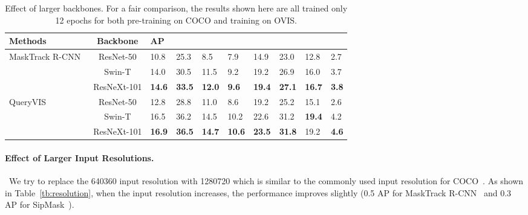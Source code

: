 \documentclass[twocolumn]{svjour3}          \smartqed  \usepackage{graphicx}
\def\myTextColor{\textcolor[rgb]{0, 0, 0}}
\begin{document}
\begin{sloppypar}
\begin{table*}
\centering
\begin{tabular}{|l|c|p{0.48cm}<{\centering}p{0.48cm}<{\centering}p{0.57cm}<{\centering}p{0.48cm}<{\centering}p{0.6cm}<{\centering}|p{0.6cm}<{\centering}p{0.6cm}<{\centering}p{0.6cm}<{\centering}|}
\hline
Methods & Backbone & AP  &   &   &   &  &   &   &  \\
\hline
\hline
\multirow{3}{*}{MaskTrack R-CNN~\cite{youtube_vis}} & ResNet-50 & 10.8 & 25.3 & 8.5 & 7.9 & 14.9 & 23.0 & 12.8 & 2.7 \\
& Swin-T & 14.0 & 30.5 & 11.5 & 9.2 & 19.2 & 26.9 & 16.0 & 3.7 \\
& ResNeXt-101 & \textbf{14.6} & \textbf{33.5} & \textbf{12.0} & \textbf{9.6} & \textbf{19.4} & \textbf{27.1} & \textbf{16.7} & \textbf{3.8} \\
\hline
\hline
\multirow{3}{*}{QueryVIS~\cite{queryinst}} & ResNet-50 & 12.8 & 28.8 & 11.0 & 8.6 & 19.2 & 25.2 & 15.1 & 2.6 \\
& Swin-T & 16.5 & 36.2 & 14.5 & 10.2 & 22.6 & 31.2 & \textbf{19.4} & 4.2 \\
& ResNeXt-101 & \textbf{16.9} & \textbf{36.5} & \textbf{14.7} & \textbf{10.6} & \textbf{23.5} & \textbf{31.8} & 19.2 & \textbf{4.6} \\
\hline
\end{tabular}
\caption{\myTextColor{Effect of larger backbones. For a fair comparison, the results shown here are all trained only 12 epochs for both pre-training on COCO and training on OVIS.}}
\label{tb:backbone}
\end{table*}

\paragraph{\myTextColor{Effect of Larger Input Resolutions.}}~\myTextColor{We try to replace the 640360 input resolution with 1280720 which is similar to the commonly used input resolution for COCO~\cite{coco}. As shown in Table~\ref{tb:resolution}, when the input resolution increases, the performance improves slightly (0.5 AP for MaskTrack R-CNN~\cite{youtube_vis} and 0.3 AP for SipMask~\cite{sipmask}).}



\end{sloppypar}
\end{document}
